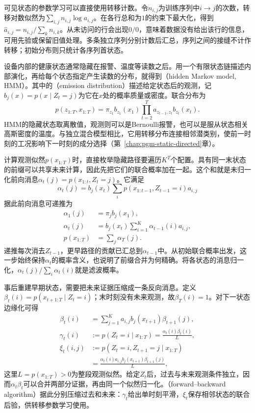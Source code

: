 可见状态的参数学习可以直接使用转移计数。令$n_{i,j}$为训练序列中$i\to j$的次数，转移对数似然为$\sum_{i,j}n_{i,j}\log a_{i,j}$。在各行总和为$1$的约束下最大化，得到$\widehat a_{i,j}=n_{i,j}/\sum_k n_{i,k}$。从未访问的行会出现$0/0$，意味着数据没有给出该行的信息，可用先验或保留旧值处理。多条独立序列分别计数后汇总，序列之间的接缝不计作转移；初始分布则只统计各序列首状态。

设备内部的健康状态通常隐藏在报警、温度等读数之后。用一个有限状态链描述内部演化，再给每个状态指定产生读数的分布，就得到（hidden Markov model, HMM）。其中的（emission distribution）描述给定状态后的观测，记$b_j(x)=p(x\mid Z_t=j)$为它在$x$处的概率质量或密度。联合分布为
\begin{equation}
  p(z_{1:T},x_{1:T})
    =\pi_{z_1}b_{z_1}(x_1)
      \prod_{t=2}^{T}a_{z_{t-1},z_t}b_{z_t}(x_t).
  \label{eq:pgm-dynamic-hmm}
\end{equation}
HMM的隐藏状态取离散值，观测则可以是Bernoulli报警，也可以是服从状态相关高斯密度的温度。与独立混合模型相比，它用转移分布连接相邻潜类别，使前一时刻的工况影响下一时刻的成分选择（第~\ref{chap:pgm-static-directed}章）。

计算观测似然$p(x_{1:T})$时，直接枚举隐藏路径要遍历$K^T$个配置。具有同一末状态的前缀可以共享未来计算，因此先把它们的联合概率加在一起。这个和就是未归一化前向消息$\alpha_t(j)=p(x_{1:t},Z_t=j)$。它满足
\[
  \alpha_t(j)
    =b_j(x_t)\sum_i
      p(x_{1:t-1},Z_{t-1}=i)a_{i,j}
\]
据此前向消息可递推为
\begin{equation}
  \begin{aligned}
    \alpha_1(j)&=\pi_jb_j(x_1),\\
    \alpha_t(j)&=b_j(x_t)\sum_{i=1}^{K}
      \alpha_{t-1}(i)a_{i,j},\\
    p(x_{1:T})&=\sum_j\alpha_T(j).
  \end{aligned}
  \label{eq:pgm-dynamic-forward}
\end{equation}
递推每次消去$Z_{t-1}$，更早路径的贡献已汇总到$\alpha_{t-1}$中。从初始联合概率出发，这一步始终保持$\alpha_t$的概率含义，也说明了前缀合并为何精确。将各状态的消息归一化，$\alpha_t(j)/\sum_i\alpha_t(i)$就是滤波概率。

事后重建早期状态，需要把未来证据压缩成一条反向消息。定义$\beta_t(i)=p(x_{t+1:T}\mid Z_t=i)$；末时刻没有未来观测，故$\beta_T(i)=1$。对下一状态边缘化可得
\begin{equation}
  \begin{aligned}
    \beta_t(i)&=\sum_{j=1}^{K}
      a_{i,j}b_j(x_{t+1})\beta_{t+1}(j),\\
    \gamma_t(i)&:=p(Z_t=i\mid x_{1:T})
      =\frac{\alpha_t(i)\beta_t(i)}{L},\\
    \xi_t(i,j)&:=p(Z_t=i,Z_{t+1}=j\mid x_{1:T})\\
      &=\frac{\alpha_t(i)a_{i,j}b_j(x_{t+1})
        \beta_{t+1}(j)}{L},
  \end{aligned}
  \label{eq:pgm-dynamic-backward}
\end{equation}
这里$L=p(x_{1:T})>0$为整段观测似然。给定$Z_t$后，过去与未来观测条件独立，因而$\alpha_t\beta_t$可以合并两部分证据，再由同一个似然归一化。（forward--backward algorithm）据此分别压缩过去和未来：$\gamma_t$给出单时刻平滑，$\xi_t$保存相邻状态的联合后验，供转移参数学习使用。

